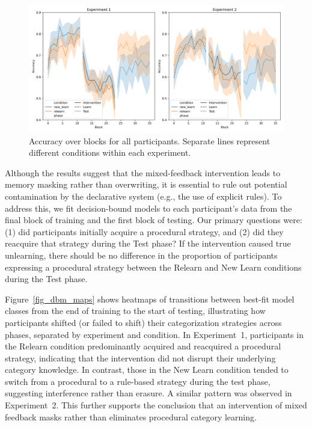 \documentclass{article}
\begin{document}
\begin{figure}[H]
    \centering
    \includegraphics[width=\textwidth]{../figures/subjects_accuracy_all.png}
    \caption{
        Accuracy over blocks for all participants. Separate
        lines represent different conditions within each
        experiment.
}
\label{fig_learning_curves}
\end{figure}

Although the results suggest that the mixed-feedback
intervention leads to memory masking rather than
overwriting, it is essential to rule out potential
contamination by the declarative system (e.g., the use of
explicit rules). To address this, we fit decision-bound
models to each participant's data from the final block of
training and the first block of testing. Our primary
questions were: (1) did participants initially acquire a
procedural strategy, and (2) did they reacquire that
strategy during the Test phase? If the intervention caused
true unlearning, there should be no difference in the
proportion of participants expressing a procedural strategy
between the Relearn and New Learn conditions during the Test
phase.

Figure~\ref{fig_dbm_maps} shows heatmaps of transitions
between best-fit model classes from the end of training to
the start of testing, illustrating how participants shifted
(or failed to shift) their categorization strategies across
phases, separated by experiment and condition. In
Experiment~1, participants in the Relearn condition
predominantly acquired and reacquired a procedural strategy,
indicating that the intervention did not disrupt their
underlying category knowledge. In contrast, those in the New
Learn condition tended to switch from a procedural to a
rule-based strategy during the test phase, suggesting
interference rather than erasure. A similar pattern was
observed in Experiment~2. This further supports the
conclusion that an intervention of mixed feedback masks
rather than eliminates procedural category learning.
\end{document}
